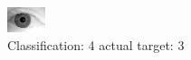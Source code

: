 \begin{figure}[h!]
\begin{center}
\includegraphics[width=0.60\columnwidth]{figures/ID2055_class_4_target_3.png}
\end{center}
\caption{ Classification: 4 actual target: 3}
\label{fig:ID2055_class_4_target_3}
\end{figure}
